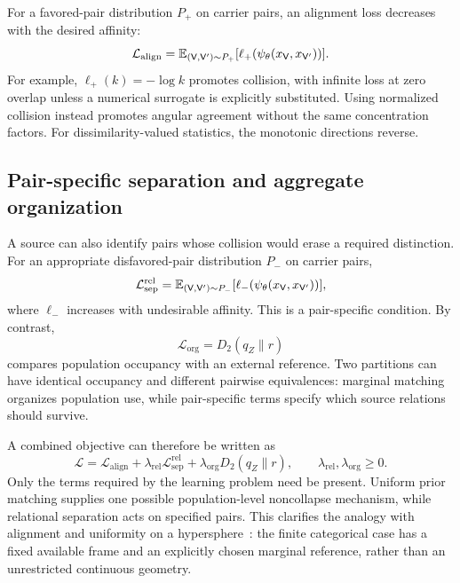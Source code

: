 For a favored-pair distribution $P_+$ on carrier pairs, an alignment loss decreases with the desired affinity:
\begin{equation}
\mathcal L_{\mathrm{align}}
=\mathbb{E}_{(\mathsf V,\mathsf V')\sim P_+}[\ell_+(\psi_\theta(x_{\mathsf V},x_{\mathsf V'}))].
\label{eq:general-alignment}
\end{equation}
For example, $\ell_+(k)=-\log k$ promotes collision, with infinite loss at zero overlap unless a numerical surrogate is explicitly substituted.
Using normalized collision instead promotes angular agreement without the same concentration factors.
For dissimilarity-valued statistics, the monotonic directions reverse.

\subsection{Pair-specific separation and aggregate organization}

A source can also identify pairs whose collision would erase a required distinction.
For an appropriate disfavored-pair distribution $P_-$ on carrier pairs,
\begin{equation}
\mathcal L_{\mathrm{sep}}^{\mathrm{rel}}
=\mathbb{E}_{(\mathsf V,\mathsf V')\sim P_-}[\ell_-(\psi_\theta(x_{\mathsf V},x_{\mathsf V'}))],
\label{eq:relational-separation}
\end{equation}
where $\ell_-$ increases with undesirable affinity.
This is a pair-specific condition.
By contrast,
\begin{equation}
\mathcal L_{\mathrm{org}}=D_2(q_Z\|r)
\label{eq:marginal-organization}
\end{equation}
compares population occupancy with an external reference.
Two partitions can have identical occupancy and different pairwise equivalences: marginal matching organizes population use, while pair-specific terms specify which source relations should survive.

A combined objective can therefore be written as
\begin{equation}
\mathcal L
=\mathcal L_{\mathrm{align}}
+\lambda_{\mathrm{rel}}\mathcal L_{\mathrm{sep}}^{\mathrm{rel}}
+\lambda_{\mathrm{org}}D_2(q_Z\|r),
\qquad\lambda_{\mathrm{rel}},\lambda_{\mathrm{org}}\ge0.
\label{eq:alignment-relational-marginal}
\end{equation}
Only the terms required by the learning problem need be present.
Uniform prior matching supplies one possible population-level noncollapse mechanism, while relational separation acts on specified pairs.
This clarifies the analogy with alignment and uniformity on a hypersphere~\citep{wang2020alignment}: the finite categorical case has a fixed available frame and an explicitly chosen marginal reference, rather than an unrestricted continuous geometry.

